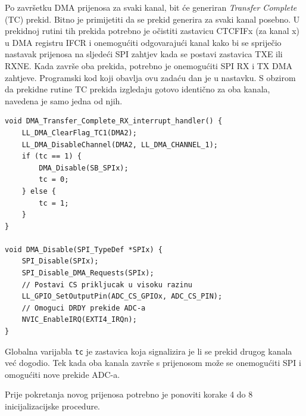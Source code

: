 Po završetku DMA prijenosa za svaki kanal, bit će generiran \textit{Transfer Complete} (TC) prekid. Bitno je primijetiti da se prekid generira za svaki kanal posebno. U prekidnoj rutini tih prekida potrebno je očistiti zastavicu CTCFIFx (za kanal x) u DMA registru IFCR i onemogućiti odgovarajući kanal kako bi se spriječio nastavak prijenosa na sljedeći SPI zahtjev kada se postavi zastavica TXE ili RXNE. Kada završe oba prekida, potrebno je onemogućiti SPI RX i TX DMA zahtjeve. Programski kod koji obavlja ovu zadaću dan je u nastavku. S obzirom da prekidne rutine TC prekida izgledaju gotovo identično za oba kanala, navedena je samo jedna od njih.

\begin{lstlisting}
void DMA_Transfer_Complete_RX_interrupt_handler() {
	LL_DMA_ClearFlag_TC1(DMA2);
	LL_DMA_DisableChannel(DMA2, LL_DMA_CHANNEL_1);
	if (tc == 1) {
		DMA_Disable(SB_SPIx);
		tc = 0;
	} else {
		tc = 1;
	}
}

void DMA_Disable(SPI_TypeDef *SPIx) {
	SPI_Disable(SPIx);
	SPI_Disable_DMA_Requests(SPIx);
	// Postavi CS prikljucak u visoku razinu
	LL_GPIO_SetOutputPin(ADC_CS_GPIOx, ADC_CS_PIN);
	// Omoguci DRDY prekide ADC-a
	NVIC_EnableIRQ(EXTI4_IRQn);
}
\end{lstlisting}

Globalna varijabla \texttt{tc} je zastavica koja signalizira je li se prekid drugog kanala već dogodio. Tek kada oba kanala završe s prijenosom može se onemogućiti SPI i omogućiti nove prekide ADC-a.

Prije pokretanja novog prijenosa potrebno je ponoviti korake 4 do 8 inicijalizacijske procedure.

